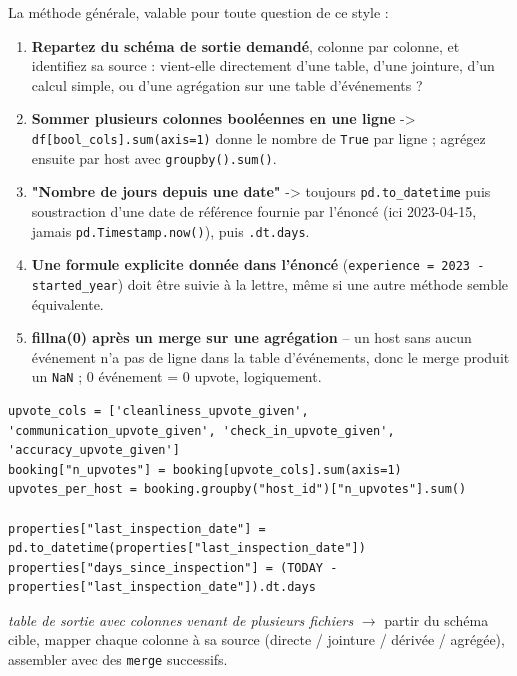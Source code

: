 \documentclass[11pt]{article}
\begin{document}
\begin{explik}
La m\'ethode g\'en\'erale, valable pour toute question de ce style :
\begin{enumerate}[nosep]
  \item \textbf{Repartez du sch\'ema de sortie demand\'e}, colonne par
        colonne, et identifiez sa source : vient-elle directement d'une
        table, d'une jointure, d'un calcul simple, ou d'une agr\'egation
        sur une table d'\'ev\'enements ?
  \item \textbf{Sommer plusieurs colonnes bool\'eennes en une ligne} ->
        \texttt{df[bool\_cols].sum(axis=1)} donne le nombre de
        \texttt{True} par ligne ; agr\'egez ensuite par host avec
        \texttt{groupby().sum()}.
  \item \textbf{"Nombre de jours depuis une date"} -> toujours
        \texttt{pd.to\_datetime} puis soustraction d'une date de r\'ef\'erence
        fournie par l'\'enonc\'e (ici 2023-04-15, jamais
        \texttt{pd.Timestamp.now()}), puis \texttt{.dt.days}.
  \item \textbf{Une formule explicite donn\'ee dans l'\'enonc\'e}
        (\texttt{experience = 2023 - started\_year}) doit \^etre suivie
        \`a la lettre, m\^eme si une autre m\'ethode semble \'equivalente.
  \item \textbf{fillna(0) apr\`es un merge sur une agr\'egation} -- un
        host sans aucun \'ev\'enement n'a pas de ligne dans la
        table d'\'ev\'enements, donc le merge produit un \texttt{NaN} ; 0
        \'ev\'enement = 0 upvote, logiquement.
\end{enumerate}
\end{explik}

\begin{lstlisting}
upvote_cols = ['cleanliness_upvote_given', 'communication_upvote_given', 'check_in_upvote_given', 'accuracy_upvote_given']
booking["n_upvotes"] = booking[upvote_cols].sum(axis=1)
upvotes_per_host = booking.groupby("host_id")["n_upvotes"].sum()

properties["last_inspection_date"] = pd.to_datetime(properties["last_inspection_date"])
properties["days_since_inspection"] = (TODAY - properties["last_inspection_date"]).dt.days
\end{lstlisting}

\begin{pat}
\emph{\og table de sortie avec colonnes venant de plusieurs fichiers \fg}
$\to$ partir du sch\'ema cible, mapper chaque colonne \`a sa source
(directe / jointure / d\'eriv\'ee / agr\'eg\'ee), assembler avec des
\texttt{merge} successifs.
\end{pat}
\end{document}
